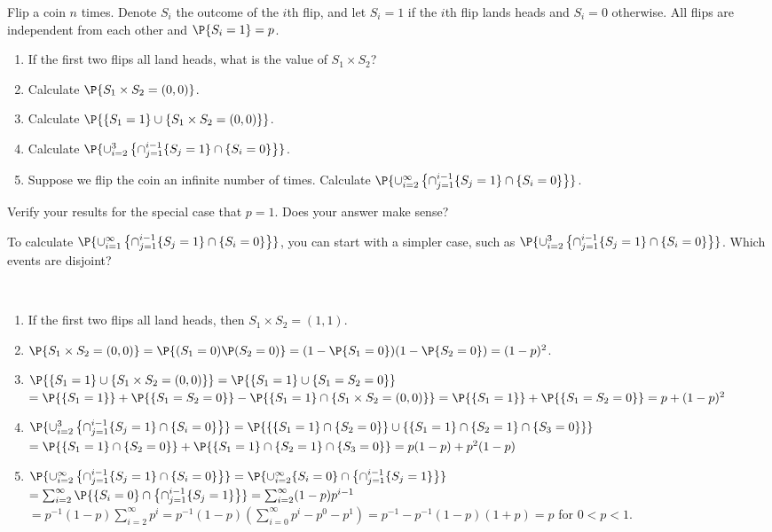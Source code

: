 	\begin{exercise}
		Flip a coin $n$ times. Denote $S_i$ the outcome of the $i$th flip, and let $S_i = 1$ if the $i$th flip lands heads and $S_i = 0$ otherwise. All flips are independent from each other and $\P{S_i = 1} = p$.
		\begin{enumerate}
			\item If the first two flips all land heads, what is the value of $S_1 \times S_2$?
			\item Calculate $\P{S_1 \times S_2 = (0,0)}$.
			\item Calculate $\P{\{S_1=1\}\cup \{S_1\times S_2 =(0,0) \}}$.
			\item Calculate $\P{\cup_{i=2}^3 \left\{\cap_{j=1}^{i-1}\{S_j=1 \} \cap \{S_i=0\} \right\}}$.
			\item Suppose we flip the coin an infinite number of times. Calculate 
			$\P{\cup_{i=2}^\infty \left\{\cap_{j=1}^{i-1}\{S_j=1 \} \cap \{S_i=0\} \right\}}$.
		\end{enumerate}
		Verify your results for the special case that $p = 1$. Does your answer make sense?
		\begin{hint}
			To calculate $\P{\cup_{i=1}^\infty \left\{\cap_{j=1}^{i-1}\{S_j=1 \} \cap \{S_i=0\} \right\} }$, you can start with a simpler case, such as $\P{\cup_{i=2}^3 \left\{\cap_{j=1}^{i-1}\{S_j=1 \} \cap \{S_i=0\} \right\} }$. Which events are disjoint?
		\end{hint}
		\begin{solution}~
			\begin{enumerate}
				\item If the first two flips all land heads, then $S_1 \times S_2 = (1,1)$.
				\item $\P{S_1 \times S_2 = (0,0)} = \P{(S_1=0)\P(S_2=0)}=(1-\P{S_1=0})(1-\P{S_2=0})=(1-p)^2$.
				\item $\P{\{S_1=1\}\cup \{S_1\times S_2 =(0,0) \}} = \P{\{S_1=1\} \cup \{S_1 = S_2 =0\}}$\\$= \P{\{S_1=1\}} + \P{\{S_1 = S_2 = 0\}} - \P{\{S_1=1\} \cap \{S_1\times S_2 =(0,0) \}} =\P{\{S_1=1\}} + \P{\{S_1 = S_2 = 0\}}= p + (1 - p)^2$
				\item $\P{\cup_{i=2}^3 \left\{\cap_{j=1}^{i-1}\{S_j=1 \} \cap \{S_i=0\} \right\} } = \P{\{\{S_1 = 1\} \cap \{S_2 = 0\}\} \cup \{\{S_1 = 1\} \cap \{S_2 = 1\} \cap \{S_3 = 0\}\}}$ \\ $= \P{\{S_1 = 1\} \cap \{S_2 = 0\}} + \P{\{S_1 = 1\} \cap \{S_2 = 1\} \cap \{S_3 = 0\}} = p(1 - p) + p^2 (1 - p)$
				\item $\P{\cup_{i=2}^\infty \left\{\cap_{j=1}^{i-1}\{S_j=1 \} \cap \{S_i=0\} \right\}} = \P{\cup_{i=2}^\infty \{S_i=0\} \cap \left\{\cap_{j=1}^{i-1}\{S_j=1 \} \right\}}$ \\ $ = \sum_{i = 2}^{\infty} \P{\{S_i=0\} \cap \left\{\cap_{j=1}^{i-1}\{S_j=1 \} \right\}} = \sum_{i = 2}^{\infty} (1 - p) p^{i - 1} $ \\ $= p^{-1} (1 - p) \sum_{i = 2}^{\infty} p^i = p^{-1} (1 - p) (\sum_{i = 0}^{\infty} p^i - p^0 - p^1) = p^{-1} - p^{-1}(1-p)(1 + p) = p$ for $0<p<1$.
			\end{enumerate}
		\end{solution}
	\end{exercise}
	
